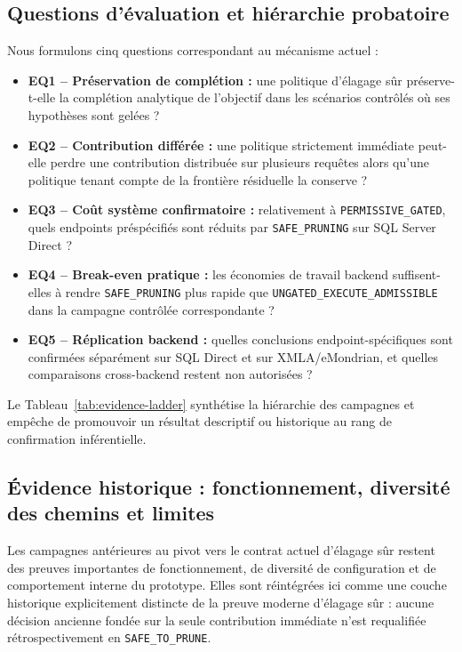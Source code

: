 \documentclass[journal]{IEEEtran}
\begin{document}
\subsection{Questions d'évaluation et hiérarchie probatoire}

Nous formulons cinq questions correspondant au mécanisme actuel :
\begin{itemize}
  \item \textbf{EQ1 -- Préservation de complétion :} une politique d'élagage sûr préserve-t-elle la complétion analytique de l'objectif dans les scénarios contrôlés où ses hypothèses sont gelées ?
  \item \textbf{EQ2 -- Contribution différée :} une politique strictement immédiate peut-elle perdre une contribution distribuée sur plusieurs requêtes alors qu'une politique tenant compte de la frontière résiduelle la conserve ?
  \item \textbf{EQ3 -- Coût système confirmatoire :} relativement à \texttt{PERMISSIVE\_GATED}, quels endpoints préspécifiés sont réduits par \texttt{SAFE\_PRUNING} sur SQL Server Direct ?
  \item \textbf{EQ4 -- Break-even pratique :} les économies de travail backend suffisent-elles à rendre \texttt{SAFE\_PRUNING} plus rapide que \texttt{UNGATED\_EXECUTE\_ADMISSIBLE} dans la campagne contrôlée correspondante ?
  \item \textbf{EQ5 -- Réplication backend :} quelles conclusions endpoint-spécifiques sont confirmées séparément sur SQL Direct et sur XMLA/eMondrian, et quelles comparaisons cross-backend restent non autorisées ?
\end{itemize}

Le Tableau~\ref{tab:evidence-ladder} synthétise la hiérarchie des campagnes et empêche de promouvoir un résultat descriptif ou historique au rang de confirmation inférentielle.



\subsection{Évidence historique : fonctionnement, diversité des chemins et limites}

Les campagnes antérieures au pivot vers le contrat actuel d'élagage sûr restent des preuves importantes de fonctionnement, de diversité de configuration et de comportement interne du prototype. Elles sont réintégrées ici comme une couche historique explicitement distincte de la preuve moderne d'élagage sûr : aucune décision ancienne fondée sur la seule contribution immédiate n'est requalifiée rétrospectivement en \texttt{SAFE\_TO\_PRUNE}.
\end{document}
